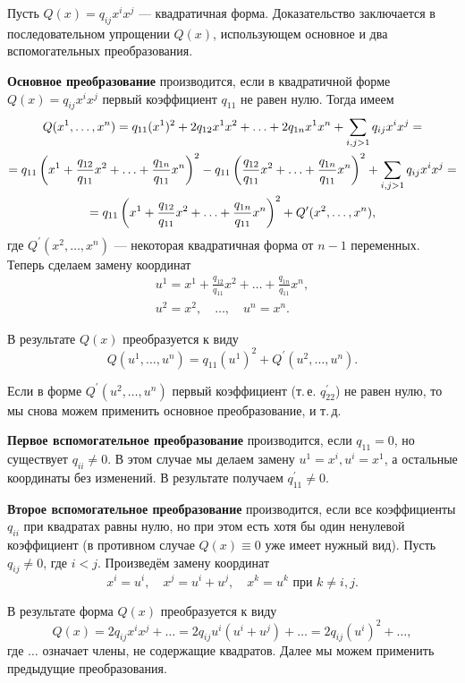 \smallskip
{}
Пусть $Q(x) = q_{ij}x^ix^j$ --- квадратичная форма. Доказательство заключается в последовательном упрощении $Q(x)$, использующем основное и два вспомогательных преобразования.

\textbf{Основное преобразование} производится, если в квадратичной форме $Q(x) = q_{ij}x^ix^j$ первый коэффициент $q_{11}$ не равен нулю. Тогда имеем
\begin{multline*}
    Q(x^1, \ldots, x^n) = q_{11}(x^1)^2 + 2q_{12}x^1x^2 + \ldots + 2q_{1n}x^1x^n + \sum_{i, j > 1}q_{ij}x^ix^j =\\ =
    q_{11}\left(x^1 + \frac{q_{12}}{q_{11}}x^2 + \ldots + \frac{q_{1n}}{q_{11}}x^n\right)^2 - q_{11}\left(\frac{q_{12}}{q_{11}}x^2 + \ldots + \frac{q_{1n}}{q_{11}}x^n\right)^2 + \sum_{i, j > 1}q_{ij}x^ix^j =\\ = q_{11}\left(x^1 + \frac{q_{12}}{q_{11}}x^2 + \ldots + \frac{q_{1n}}{q_{11}}x^n\right)^2 + Q^\prime(x^2, \ldots, x^n),
\end{multline*}
где $Q^\prime(x^2, \ldots, x^n)$ --- некоторая квадратичная форма от $n - 1$ переменных. Теперь сделаем замену координат
\begin{gather*}
    u^1 = x^1 + \frac{q_{12}}{q_{11}}x^2 + \ldots + \frac{q_{1n}}{q_{11}}x^n,\\
    u^2 = x^2,\quad \ldots,\quad u^n = x^n.
\end{gather*}

В результате $Q(x)$ преобразуется к виду
\[
    Q(u^1, \ldots, u^n) = q_{11}(u^1)^2 + Q^\prime(u^2, \ldots, u^n).
\]

Если в форме $Q^\prime(u^2, \ldots, u^n)$ первый коэффициент (т.\,е. $q^\prime_{22}$) не равен нулю, то мы снова можем применить основное преобразование, и т.\,д.

\textbf{Первое вспомогательное преобразование} производится, если $q_{11} = 0$, но существует $q_{ii} \ne 0$. В этом случае мы делаем замену $u^1 = x^i, u^i = x^1$, а остальные координаты без изменений. В результате получаем $q^\prime_{11} \ne 0$.

\textbf{Второе вспомогательное преобразование} производится, если все коэффициенты $q_{ii}$ при квадратах равны нулю, но при этом есть хотя бы один ненулевой коэффициент (в противном случае $Q(x) \equiv 0$ уже имеет нужный вид). Пусть $q_{ij} \ne 0$, где $i < j$. Произведём замену координат
\[
    x^i = u^i,\quad x^j = u^i + u^j,\quad x^k = u^k\text{ при $k \ne i, j$}.
\]

В результате форма $Q(x)$ преобразуется к виду
\[
    Q(x) = 2q_{ij}x^ix^j + \ldots = 2q_{ij}u^i(u^i + u^j) + \ldots = 2q_{ij}(u^i)^2 + \ldots,
\]
где $\ldots$ означает члены, не содержащие квадратов. Далее мы можем применить предыдущие преобразования.

